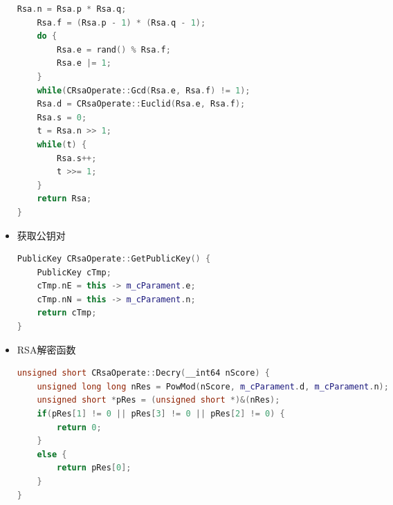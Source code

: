 \documentclass[UTF8,a4paper,10pt]{ctexart}
\begin{document}
\begin{itemize}
\begin{lstlisting}[language = C++]
    Rsa.n = Rsa.p * Rsa.q;
    Rsa.f = (Rsa.p - 1) * (Rsa.q - 1);
    do {
        Rsa.e = rand() % Rsa.f;
        Rsa.e |= 1;
    }
    while(CRsaOperate::Gcd(Rsa.e, Rsa.f) != 1);
    Rsa.d = CRsaOperate::Euclid(Rsa.e, Rsa.f);
    Rsa.s = 0;
    t = Rsa.n >> 1;
    while(t) {
        Rsa.s++;
        t >>= 1;
    }
    return Rsa;
}
  \end{lstlisting}
  \item 获取公钥对
  \begin{lstlisting}[language = C++]
PublicKey CRsaOperate::GetPublicKey() {
    PublicKey cTmp;
    cTmp.nE = this -> m_cParament.e;
    cTmp.nN = this -> m_cParament.n;
    return cTmp;
}
  \end{lstlisting}
  \item RSA解密函数
  \begin{lstlisting}[language = C++]
unsigned short CRsaOperate::Decry(__int64 nScore) {
    unsigned long long nRes = PowMod(nScore, m_cParament.d, m_cParament.n);
    unsigned short *pRes = (unsigned short *)&(nRes);
    if(pRes[1] != 0 || pRes[3] != 0 || pRes[2] != 0) {
        return 0;
    }
    else {
        return pRes[0];
    }
}
  \end{lstlisting}
\end{itemize}
\end{document}
